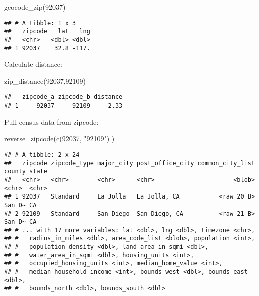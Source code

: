 \documentclass[
]{article}
\newenvironment{Shaded}{\begin{snugshade}}{\end{snugshade}}
\newcommand{\FunctionTok}[1]{\textcolor[rgb]{0.00,0.00,0.00}{#1}}
\newcommand{\NormalTok}[1]{#1}
\newcommand{\StringTok}[1]{\textcolor[rgb]{0.31,0.60,0.02}{#1}}
\begin{document}
\begin{Shaded}
\begin{Highlighting}[]
\FunctionTok{geocode\_zip}\NormalTok{(}\StringTok{\textquotesingle{}92037\textquotesingle{}}\NormalTok{)}
\end{Highlighting}
\end{Shaded}

\begin{verbatim}
## # A tibble: 1 x 3
##   zipcode   lat   lng
##   <chr>   <dbl> <dbl>
## 1 92037    32.8 -117.
\end{verbatim}

Calculate distance:

\begin{Shaded}
\begin{Highlighting}[]
\FunctionTok{zip\_distance}\NormalTok{(}\StringTok{\textquotesingle{}92037\textquotesingle{}}\NormalTok{,}\StringTok{\textquotesingle{}92109\textquotesingle{}}\NormalTok{)}
\end{Highlighting}
\end{Shaded}

\begin{verbatim}
##   zipcode_a zipcode_b distance
## 1     92037     92109     2.33
\end{verbatim}

Pull census data from zipcode:

\begin{Shaded}
\begin{Highlighting}[]
\FunctionTok{reverse\_zipcode}\NormalTok{(}\FunctionTok{c}\NormalTok{(}\StringTok{\textquotesingle{}92037\textquotesingle{}}\NormalTok{, }\StringTok{"92109"}\NormalTok{) )}
\end{Highlighting}
\end{Shaded}

\begin{verbatim}
## # A tibble: 2 x 24
##   zipcode zipcode_type major_city post_office_city common_city_list county state
##   <chr>   <chr>        <chr>      <chr>                      <blob> <chr>  <chr>
## 1 92037   Standard     La Jolla   La Jolla, CA           <raw 20 B> San D~ CA   
## 2 92109   Standard     San Diego  San Diego, CA          <raw 21 B> San D~ CA   
## # ... with 17 more variables: lat <dbl>, lng <dbl>, timezone <chr>,
## #   radius_in_miles <dbl>, area_code_list <blob>, population <int>,
## #   population_density <dbl>, land_area_in_sqmi <dbl>,
## #   water_area_in_sqmi <dbl>, housing_units <int>,
## #   occupied_housing_units <int>, median_home_value <int>,
## #   median_household_income <int>, bounds_west <dbl>, bounds_east <dbl>,
## #   bounds_north <dbl>, bounds_south <dbl>
\end{verbatim}
\end{document}
